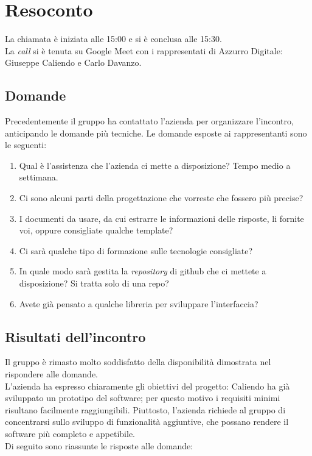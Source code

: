 \section{Resoconto}
La chiamata è iniziata alle 15:00 e si è conclusa alle 15:30. \\
La \textit{call} si è tenuta su Google Meet con i rappresentati di Azzurro
Digitale: Giuseppe Caliendo e Carlo Davanzo.
\subsection{Domande}
Precedentemente il gruppo ha contattato l'azienda per organizzare l'incontro, 
anticipando le domande più tecniche.
Le domande esposte ai rappresentanti sono le seguenti:

\begin{enumerate}
	\item Qual è l'assistenza che l'azienda ci mette a disposizione? Tempo medio a
  settimana.
	\item Ci sono alcuni parti della progettazione che vorreste che fossero più precise?
	\item I documenti da usare, da cui estrarre le informazioni delle risposte, li
	  fornite voi, oppure consigliate qualche template?
	\item Ci sarà qualche tipo di formazione sulle tecnologie consigliate?
	\item In quale modo sarà gestita la \textit{repository} di github che ci mettete a 
		disposizione? Si tratta solo di una repo?
	\item Avete già pensato a qualche libreria per sviluppare l'interfaccia?
\end{enumerate}

\subsection{Risultati dell'incontro}
Il gruppo è rimasto molto soddisfatto della disponibilità dimostrata nel 
rispondere alle domande. \\ 
L'azienda ha espresso chiaramente gli obiettivi del progetto: Caliendo ha già
sviluppato un prototipo del software; per questo motivo i requisiti minimi
risultano facilmente raggiungibili. Piuttosto, l'azienda richiede al gruppo di
concentrarsi sullo sviluppo di funzionalità aggiuntive, che possano rendere il
software più completo e appetibile. \\
Di seguito sono riassunte le risposte alle domande:

